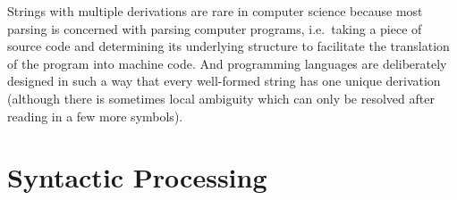 \begin{remark}
    Strings with multiple derivations are rare in computer science because most parsing is concerned with parsing computer programs, i.e.\ taking a piece of source code and determining its underlying structure to facilitate the translation of the program into machine code.
    And programming languages are deliberately designed in such a way that every well-formed string has one unique derivation (although there is sometimes local ambiguity which can only be resolved after reading in a few more symbols).
\end{remark}


\section{Syntactic Processing}
\label{sec:BigPicture_Processing}

